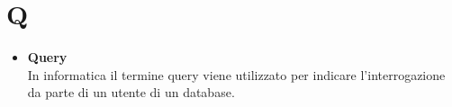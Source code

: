 \chapter{Q} \label{Q} 
\begin{itemize}
	\item \textbf{Query} \\
	In informatica il termine query viene utilizzato per indicare l'interrogazione da parte di un utente di un database.
\end{itemize}
